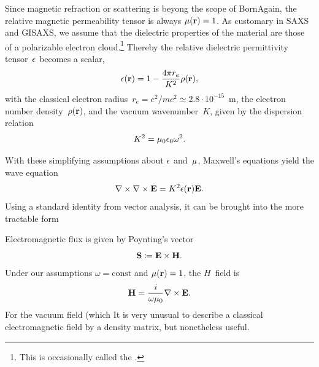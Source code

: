 Since magnetic refraction or scattering is beyong the scope of BornAgain,
the relative magnetic permeability tensor is always $\mathbf{\mu}(\mathbf{r})=1$.
%
%
As customary in SAXS and GISAXS,
%
%
we assume
that the dielectric properties of the material are those of a polarizable electron cloud.\footnote
{This is occasionally called the 
%
 \cite{Lau31}.}
Thereby the relative dielectric permittivity tensor~$\mathbf{\epsilon}$
%
%
becomes a scalar,
\begin{equation}
  \epsilon(\mathbf{r})=1-\frac{4\pi r_e}{K^2}\rho(\mathbf{r}),
\end{equation}
%
%
with the classical electron radius~$r_e=e^2/mc^2\simeq2.8\cdot10^{-15}$~m,
%
%
%
the electron number density~$\rho(\mathbf{r})$,
%
%
%
and the vacuum wavenumber~$K$,
given by the dispersion relation
\begin{equation}
  K^2 = \mu_0\epsilon_0\omega^2.
\end{equation}
%

With these simplifying assumptions about $\mathbf{\epsilon}$ and~$\mathbf{\mu}$,
Maxwell's equations yield the wave equation
\begin{equation}\label{ENabCrossNabE}
  \mathbf{\nabla}\times\mathbf{\nabla}\times\mathbf{E} = K^2\epsilon(\mathbf{r})\mathbf{E}.
\end{equation}
%
%
Using a standard identity from vector analysis, it can be brought into the more tractable form

Electromagnetic flux is given by Poynting's vector
\begin{equation}
  \mathbf{S}\coloneqq \mathbf{E}\times\mathbf{H}.
\end{equation}
Under our assumptions $\omega=\text{const}$ and $\mathsf{\mu}(\mathbf{r})=1$,
the $H$~field is
\begin{equation}
  \mathbf{H} = \frac{i}{\omega\mu_0}\mathbf{\nabla}\times\mathbf{E}.
\end{equation}
For the vacuum field (which
It is very unusual to describe a classical electromagnetic field by a density matrix,
but nonetheless useful.

